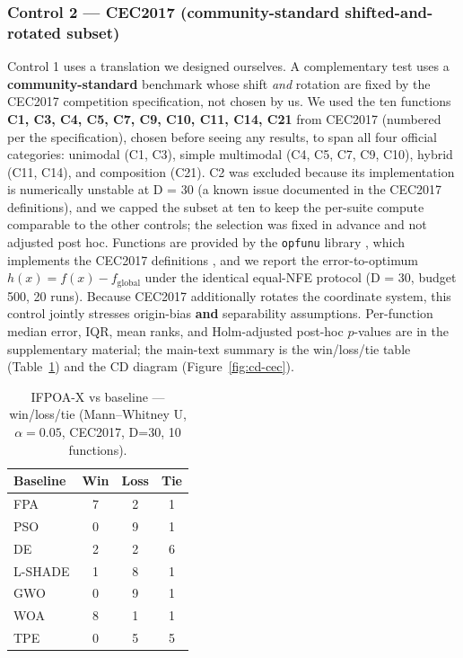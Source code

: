 \documentclass[preprint,12pt]{elsarticle}
\begin{document}
\subsubsection{Control 2 --- CEC2017 (community-standard shifted-and-rotated subset)}
\label{subsubsec5-7-2}

Control 1 uses a translation we designed ourselves. A complementary test uses a \textbf{community-standard} benchmark whose shift \emph{and} rotation are fixed by the CEC2017 competition specification, not chosen by us. We used the ten functions \textbf{C1, C3, C4, C5, C7, C9, C10, C11, C14, C21} from CEC2017 (numbered per the specification), chosen before seeing any results, to span all four official categories: unimodal (C1, C3), simple multimodal (C4, C5, C7, C9, C10), hybrid (C11, C14), and composition (C21). C2 was excluded because its implementation is numerically unstable at D = 30 (a known issue documented in the CEC2017 definitions), and we capped the subset at ten to keep the per-suite compute comparable to the other controls; the selection was fixed in advance and not adjusted post hoc. Functions are provided by the \texttt{opfunu} library \cite{vanthieu2024opfunu}, which implements the CEC2017 definitions \cite{awad2016problem}, and we report the error-to-optimum $h(x) = f(x) - f_{\text{global}}$ under the identical equal-NFE protocol (D = 30, budget 500, 20 runs). Because CEC2017 additionally rotates the coordinate system, this control jointly stresses origin-bias \textbf{and} separability assumptions. Per-function median error, IQR, mean ranks, and Holm-adjusted post-hoc $p$-values are in the supplementary material; the main-text summary is the win/loss/tie table (Table~\ref{tab:cecwlt}) and the CD diagram (Figure~\ref{fig:cd-cec}).

\begin{table}[htbp]
\centering
\caption{IFPOA-X vs baseline --- win/loss/tie (Mann--Whitney U, $\alpha=0.05$, CEC2017, D=30, 10 functions).}
\label{tab:cecwlt}
\begin{tabular}{lccc}
\hline
Baseline & Win & Loss & Tie \\
\hline
FPA & 7 & 2 & 1 \\
PSO & 0 & 9 & 1 \\
DE & 2 & 2 & 6 \\
L-SHADE & 1 & 8 & 1 \\
GWO & 0 & 9 & 1 \\
WOA & 8 & 1 & 1 \\
TPE & 0 & 5 & 5 \\
\hline
\end{tabular}
\end{table}
\end{document}
